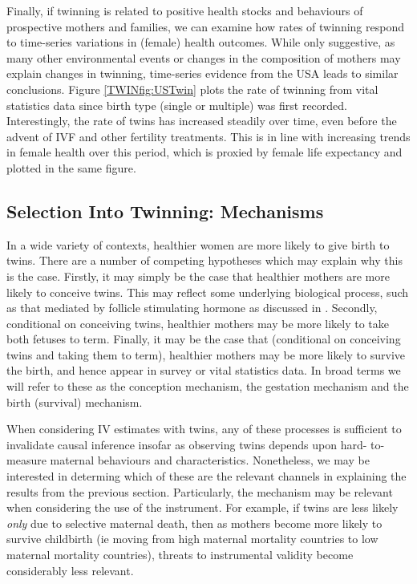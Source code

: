 \documentclass[subeqn]{article}
\begin{document}
\begin{spacing}{1.4}
Finally, if twinning is related to positive health stocks and behaviours of
prospective mothers and families, we can examine how rates of twinning respond
to time-series variations in (female) health outcomes.  While only suggestive,
as many other environmental events or changes in the composition of mothers may 
explain changes in twinning, time-series evidence from the USA leads to similar 
conclusions.  Figure
\ref{TWINfig:USTwin} plots the rate of twinning from vital statistics data since
birth type (single or multiple) was first recorded.  Interestingly, the rate of
twins has increased steadily over time, even before the advent of IVF and other
fertility treatments.  This is in line with increasing trends in female
health over this period, which is proxied by female life expectancy and plotted
in the same figure.



\subsection{Selection Into Twinning: Mechanisms}   \label{TWINsscn:selection}
In a wide variety of contexts, healthier women are more likely to give birth to
twins.  There are a number of competing hypotheses which may explain why this is
the case.  Firstly, it may simply be the case that healthier mothers are more 
likely to conceive twins.  This may reflect some underlying biological process, 
such as that mediated by follicle stimulating hormone as discussed in 
\citet{Hall2003}.  Secondly, conditional on conceiving twins, healthier mothers 
may be more likely to take both fetuses to term.  Finally, it may be the case 
that (conditional on conceiving twins and taking them to term), healthier mothers 
may be more likely to survive the birth, and hence appear in survey or vital 
statistics data.  In broad terms we will refer to these as the conception 
mechanism, the gestation mechanism and the birth (survival) mechanism.

When considering IV estimates with twins, any of these processes is sufficient 
to invalidate causal inference insofar as observing twins depends upon hard-%
to-measure maternal behaviours and characteristics.  Nonetheless, we may be 
interested in determing which of these are the relevant channels in explaining 
the results from the previous section.  Particularly, the mechanism may be 
relevant when considering the use of the instrument.  For example, if twins are 
less likely \emph{only} due to selective maternal death, then as mothers become 
more likely to survive childbirth (ie moving from high maternal mortality 
countries to low maternal mortality countries), threats to instrumental validity 
become considerably less relevant.


\end{spacing}
\end{document}

